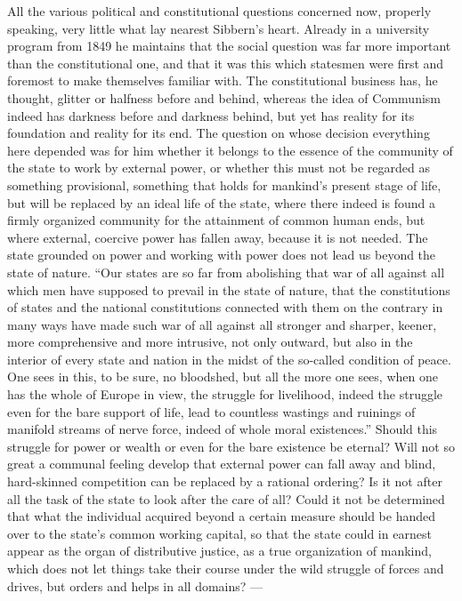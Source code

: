 \documentclass[12pt,a4paper,openany]{book}
\newcommand{\opage}[1]{\marginnote{\footnotesize\textit{[#1]}}}
\begin{document}
\opage{108}All the various political and constitutional
questions concerned now, properly speaking, very little what lay nearest
Sibbern's heart. Already in a university program from
1849 he maintains that the social question was far
more important than the constitutional one, and that it was this which statesmen
were first and foremost to make themselves familiar with. The constitutional
business has, he thought, glitter or halfness before and behind,
whereas the idea of Communism indeed has darkness before and darkness behind,
but yet has reality for its foundation and reality for its end.
The question on whose decision everything here depended was for
him whether it belongs to the essence of the community of the state to work by
external power, or whether this must not be regarded as something
provisional, something that holds for mankind's present
stage of life, but will be replaced by an ideal life of the state, where there
indeed is found a firmly organized community for the attainment of common
human ends, but where external, coercive power
has fallen away, because it is not needed. The state grounded on power
and working with power does not lead us beyond
the state of nature. ``Our states are so far from abolishing that war
of all against all which men have supposed to prevail in the state of nature,
that the constitutions of states and the national constitutions connected with them
on the contrary in many ways have made such war of
all against all stronger and sharper, keener, more comprehensive
and more intrusive, not only outward, but also in the interior of every state and
nation in the midst of the so-called condition of peace. One
sees %
 in this, to be sure, no bloodshed, but all the more
one sees, when one has the whole of Europe in view, the struggle for
livelihood, indeed the struggle even for the bare support of life,
lead to countless wastings and ruinings of manifold
streams of nerve force, indeed of whole moral existences.''
Should this struggle for power or wealth or even for
the bare existence be eternal? Will not so great a
\opage{109}communal feeling develop that external power can fall away and
blind, hard-skinned competition can be replaced by a rational
ordering? Is it not after all the task of the state to look after
the care of all? Could it not be determined that what the
individual acquired beyond a certain measure should be handed over to
the state's common working capital, so that the state could in earnest
appear as the organ of distributive justice, as a
true organization of mankind, which does not let things take their
course under the wild struggle of forces and drives, but orders
and helps in all domains? ---
\end{document}
